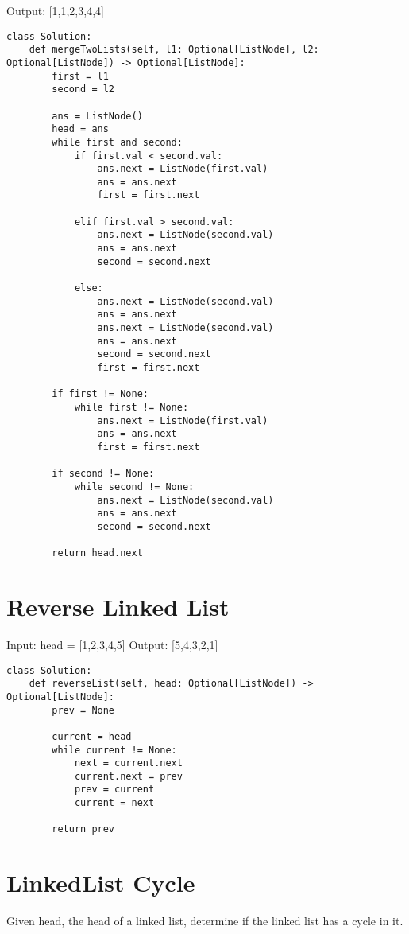 \documentclass[24pt, a4]{article}
\begin{document}
Output: [1,1,2,3,4,4]

\begin{lstlisting}
class Solution:
    def mergeTwoLists(self, l1: Optional[ListNode], l2: Optional[ListNode]) -> Optional[ListNode]:
        first = l1
        second = l2
        
        ans = ListNode()
        head = ans
        while first and second:
            if first.val < second.val:
                ans.next = ListNode(first.val)
                ans = ans.next
                first = first.next
            
            elif first.val > second.val:
                ans.next = ListNode(second.val)
                ans = ans.next
                second = second.next
            
            else:
                ans.next = ListNode(second.val)
                ans = ans.next
                ans.next = ListNode(second.val)
                ans = ans.next
                second = second.next
                first = first.next
            
        if first != None:
            while first != None:
                ans.next = ListNode(first.val)
                ans = ans.next
                first = first.next
        
        if second != None:
            while second != None:
                ans.next = ListNode(second.val)
                ans = ans.next
                second = second.next
        
        return head.next
\end{lstlisting}


\section{Reverse Linked List}
Input: head = [1,2,3,4,5]
Output: [5,4,3,2,1]
\begin{lstlisting}
class Solution:
    def reverseList(self, head: Optional[ListNode]) -> Optional[ListNode]:
        prev = None
        
        current = head
        while current != None:
            next = current.next
            current.next = prev
            prev = current
            current = next
        
        return prev
\end{lstlisting}

\section{LinkedList Cycle}
Given head, the head of a linked list, determine if the linked list has a cycle in it.
\end{document}
